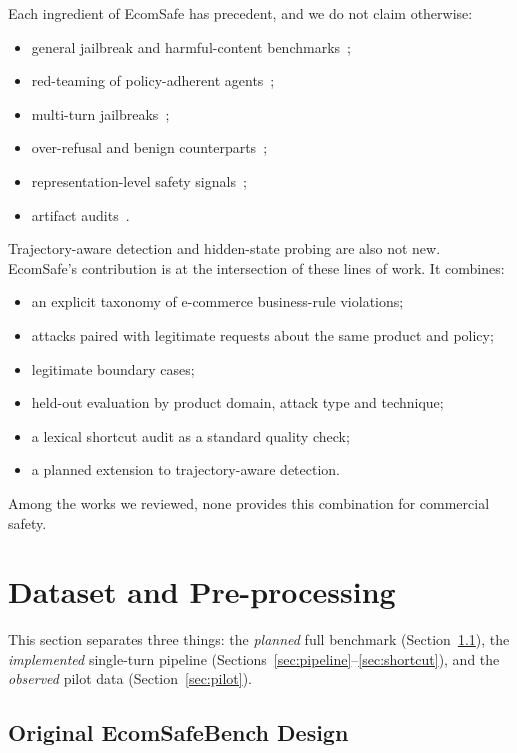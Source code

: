 \documentclass[sigconf,nonacm]{acmart}
\begin{document}
Each ingredient of EcomSafe has precedent, and we do not claim otherwise:
\begin{itemize}
  \item general jailbreak and harmful-content benchmarks~\cite{mazeika2024harmbench,chao2024jailbreakbench};
  \item red-teaming of policy-adherent agents~\cite{nakash2025effective,yao2025taubench};
  \item multi-turn jailbreaks~\cite{russinovich2025crescendo,ren2025llms};
  \item over-refusal and benign counterparts~\cite{rottger2024xstest,jiang2024wildteaming};
  \item representation-level safety signals~\cite{arditi2024refusal};
  \item artifact audits~\cite{gururangan2018annotation}.
\end{itemize}
Trajectory-aware detection and hidden-state probing are also not new. EcomSafe's contribution is at the intersection of these lines of work. It combines:
\begin{itemize}
  \item an explicit taxonomy of e-commerce business-rule violations;
  \item attacks paired with legitimate requests about the same product and policy;
  \item legitimate boundary cases;
  \item held-out evaluation by product domain, attack type and technique;
  \item a lexical shortcut audit as a standard quality check;
  \item a planned extension to trajectory-aware detection.
\end{itemize}
Among the works we reviewed, none provides this combination for commercial safety.

\section{Dataset and Pre-processing}
\label{sec:data}

This section separates three things: the \emph{planned} full benchmark (Section~\ref{sec:original}), the \emph{implemented} single-turn pipeline (Sections~\ref{sec:pipeline}--\ref{sec:shortcut}), and the \emph{observed} pilot data (Section~\ref{sec:pilot}).

\subsection{Original EcomSafeBench Design}
\label{sec:original}
\end{document}
